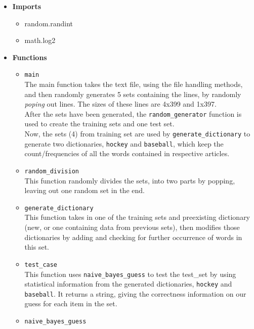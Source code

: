 \documentclass{article}
\begin{document}
    \begin{itemize}
        \item \textbf{Imports}
            \begin{itemize}
                \item random.randint
                \item math.log2
            \end{itemize}
        \item \textbf{Functions}
        \begin{center}
            \begin{itemize}
                \item \texttt{main} \\
                The main function takes the text file, using the file handling methods, and then randomly generates 5 sets containing the lines, by randomly \emph{poping} out lines. The sizes of these lines are 4x399 and 1x397.\\
                After the sets have been generated, the \texttt{random\_generator} function is used to create the training sets and one test set. \\ Now, the sets (4) from training set are used by \texttt{generate\_dictionary} to generate two dictionaries, \texttt{hockey} and \texttt{baseball}, which keep the count/frequencies of all the words contained in respective articles.
                \item \texttt{random\_division} \\
                This function randomly divides the sets, into two parts by popping, leaving out one random set in the end.
                \item \texttt{generate\_dictionary} \\
                This function takes in one of the training sets and preexisting dictionary (new, or one containing data from previous sets), then modifies those dictionaries by adding and checking for further occurrence of  words in this set.
                \item \texttt{test\_case} \\
                This function uses \texttt{naive\_bayes\_guess} to test the test\_set by using statistical information from the generated dictionaries,  \texttt{hockey} and \texttt{baseball}. It returns a string, giving the correctness information on our guess for each item in the set.
                \item \texttt{naive\_bayes\_guess} \\

\end{itemize}
\end{center}
\end{itemize}
\end{document}
